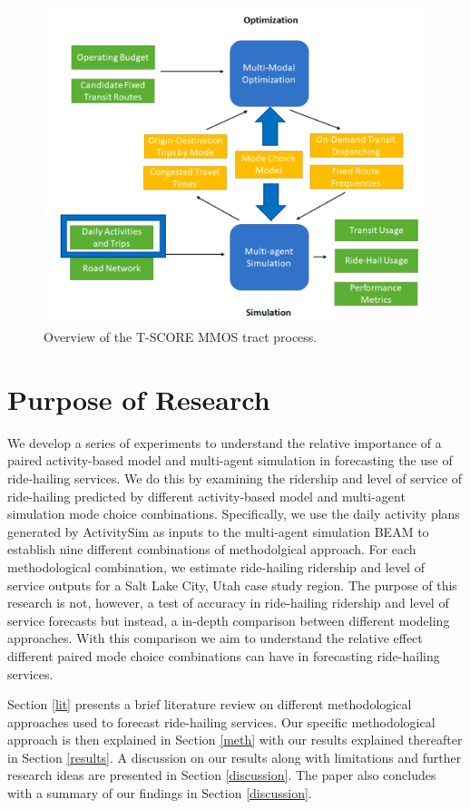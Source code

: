 \documentclass[fancy, masters]{byuthesis}
\begin{document}
\begin{figure}

{\centering \includegraphics[width=0.75\linewidth]{pics/mmos_mode} 

}

\caption{Overview of the T-SCORE MMOS tract process.}\label{fig:mmos}
\end{figure}

\hypertarget{purpose-of-research}{%
\section{Purpose of Research}\label{purpose-of-research}}

We develop a series of experiments to understand the relative importance of a paired activity-based model and multi-agent simulation in forecasting the use of ride-hailing services. We do this by examining the ridership and level of service of ride-hailing predicted by different activity-based model and multi-agent simulation mode choice combinations. Specifically, we use the daily activity plans generated by ActivitySim as inputs to the multi-agent simulation BEAM to establish nine different combinations of methodolgical approach. For each methodological combination, we estimate ride-hailing ridership and level of service outputs for a Salt Lake City, Utah case study region. The purpose of this research is not, however, a test of accuracy in ride-hailing ridership and level of service forecasts but instead, a in-depth comparison between different modeling approaches. With this comparison we aim to understand the relative effect different paired mode choice combinations can have in forecasting ride-hailing services.

Section \ref{lit} presents a brief literature review on different methodological approaches used to forecast ride-hailing services. Our specific methodological approach is then explained in Section \ref{meth} with our results explained thereafter in Section \ref{results}. A discussion on our results along with limitations and further research ideas are presented in Section \ref{discussion}. The paper also concludes with a summary of our findings in Section \ref{discussion}.
\end{document}
